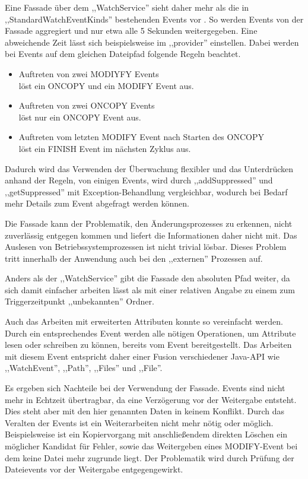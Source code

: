 \documentclass[oneside, ngerman, toc=bibliography,bibliography=totoc,listof=entryprefix, open=right,numbers=noenddot,fontsize=12pt]{scrbook}
\begin{document}
Eine Fassade  über dem ,,WatchService'' sieht daher mehr als die in  ,,StandardWatchEventKinds'' bestehenden Events vor \cite{gamma2011entwurfsmuster}. So werden Events von der Fassade aggregiert und nur etwa alle 5 Sekunden weitergegeben. Eine abweichende Zeit lässt sich beispielsweise im ,,provider'' einstellen. Dabei werden bei Events auf dem gleichen Dateipfad folgende Regeln beachtet.

\begin{itemize}
    \item Auftreten von zwei MODIYFY Events \\
    löst ein ONCOPY und ein MODIFY Event aus.
    \item Auftreten von zwei ONCOPY Events\\
    löst nur ein ONCOPY Event aus.
    \item Auftreten vom letzten MODIFY Event nach Starten des ONCOPY\\
    löst ein FINISH Event im nächsten Zyklus aus.
\end{itemize}

Dadurch wird das Verwenden der Überwachung flexibler und das Unterdrücken anhand der Regeln, von einigen Events, wird durch ,,addSuppressed'' und ,,getSuppressed'' mit Exception-Behandlung vergleichbar, wodurch bei Bedarf mehr Details zum Event abgefragt werden können.

Die Fassade kann der Problematik, den Änderungsprozesses zu erkennen, nicht zuverlässig entgegen kommen und liefert die Informationen daher nicht mit. Das Auslesen von Betriebssystemprozessen ist nicht trivial lösbar. Dieses Problem tritt innerhalb der Anwendung auch bei den ,,externen'' Prozessen auf.

Anders als der ,,WatchService'' gibt die Fassade den absoluten Pfad weiter, da sich damit einfacher arbeiten lässt als mit einer relativen Angabe zu einem zum Triggerzeitpunkt ,,unbekannten'' Ordner.

Auch das Arbeiten mit erweiterten Attributen konnte so vereinfacht werden.
Durch ein entsprechendes Event werden alle nötigen Operationen, um Attribute lesen oder schreiben zu können, bereits vom Event bereitgestellt. Das Arbeiten mit diesem Event entspricht daher einer Fusion verschiedener Java-API wie ,,WatchEvent'', ,,Path'', ,,Files'' und ,,File''.

Es ergeben sich Nachteile bei der Verwendung  der Fassade. Events sind nicht mehr in Echtzeit übertragbar, da eine Verzögerung vor der Weitergabe entsteht. Dies steht aber mit den hier genannten Daten in keinem Konflikt. Durch das Veralten der Events ist ein Weiterarbeiten nicht mehr nötig oder möglich. Beispielsweise ist ein Kopiervorgang mit anschließendem direkten Löschen ein möglicher Kandidat für Fehler, sowie das Weitergeben eines MODIFY-Event bei dem keine Datei mehr zugrunde liegt.
Der Problematik wird durch Prüfung der Dateievents vor der Weitergabe entgegengewirkt.
\end{document}
